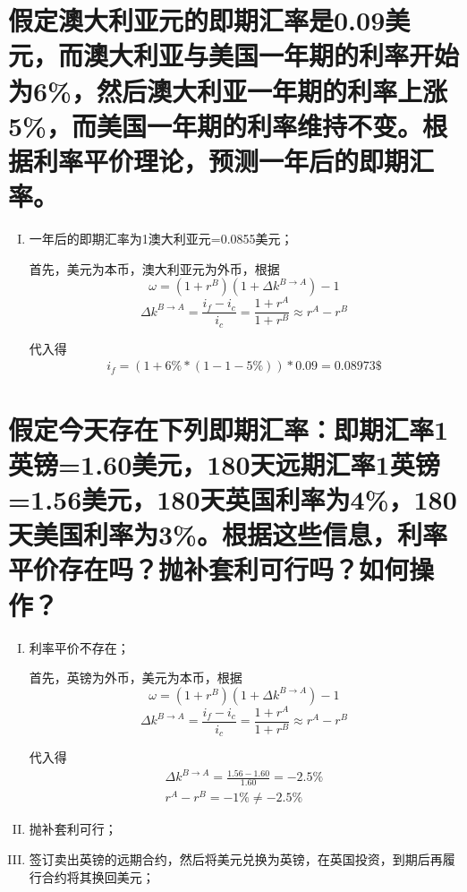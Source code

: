\documentclass[UTF8]{ctexart}
\begin{document}
    \section{假定澳大利亚元的即期汇率是0.09美元，而澳大利亚与美国一年期的利率开始为6\%，然后澳大利亚一年期的利率上涨5\%，而美国一年期的利率维持不变。根据利率平价理论，预测一年后的即期汇率。}
    \begin{enumerate}[I.]
        \item 一年后的即期汇率为1澳大利亚元=0.0855美元；\par 首先，美元为本币，澳大利亚元为外币，根据$$\omega = (1+r^B)(1+\Delta k^{B\rightarrow A}) - 1$$
        $$\Delta k^{B\rightarrow A} = \frac{i_f - i_{c}}{i_c} = \frac{1+r^A}{1+r^B} \approx r^A - r^B$$\par 代入得
        \begin{align}
            i_f = (1+6\%*(1-1-5\%))*0.09 = 0.08973\$
        \end{align}
    \end{enumerate}

    \section{假定今天存在下列即期汇率：即期汇率1英镑=1.60美元，180天远期汇率1英镑=1.56美元，180天英国利率为4\%，180天美国利率为3\%。根据这些信息，利率平价存在吗？抛补套利可行吗？如何操作？}
    \begin{enumerate}[I.]
        \item 利率平价不存在；\par 首先，英镑为外币，美元为本币，根据$$\omega = (1+r^B)(1+\Delta k^{B\rightarrow A}) - 1$$
        $$\Delta k^{B\rightarrow A} = \frac{i_f - i_{c}}{i_c} = \frac{1+r^A}{1+r^B} \approx r^A - r^B$$\par 代入得
        \begin{align}
            \Delta k^{B\rightarrow A} = \frac{1.56-1.60}{1.60} = -2.5\%\\
            r^A - r^B = -1\% \neq -2.5\%
        \end{align}
        \item 抛补套利可行；
        \item 签订卖出英镑的远期合约，然后将美元兑换为英镑，在英国投资，到期后再履行合约将其换回美元；
    \end{enumerate}
\end{document}
